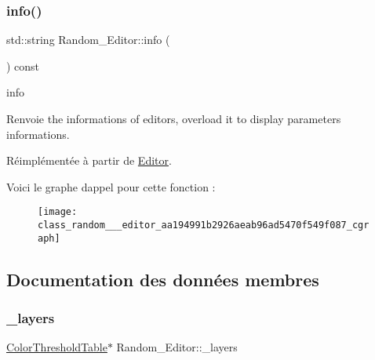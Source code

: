 \subsubsection{\texorpdfstring{info()}{info()}}
{\footnotesize\ttfamily std\+::string Random\+\_\+\+Editor\+::info (\begin{DoxyParamCaption}{ }\end{DoxyParamCaption}) const\hspace{0.3cm}{\ttfamily [virtual]}}



info 

\begin{DoxyReturn}{Renvoie}
the informations of editors, overload it to display parameters informations. 
\end{DoxyReturn}


Réimplémentée à partir de \hyperlink{class_editor_a5747cd74b71d67f6d39b094071058382}{Editor}.

Voici le graphe d\textquotesingle{}appel pour cette fonction \+:
\nopagebreak
\begin{figure}[H]
\begin{center}
\leavevmode
\texttt{[image: class\_random\_\_\_editor\_aa194991b2926aeab96ad5470f549f087\_cgraph]}
\end{center}
\end{figure}


\subsection{Documentation des données membres}
\mbox{\label{class_random___editor_af2105a201bbe9cf3ad46137037a6b69d}} 
\subsubsection{\texorpdfstring{\+\_\+layers}{\_layers}}
{\footnotesize\ttfamily \hyperlink{thresholdtable_8h_ab0deb49d07758f9814993774cb9935cc}{Color\+Threshold\+Table}$\ast$ Random\+\_\+\+Editor\+::\+\_\+layers\hspace{0.3cm}{\ttfamily [private]}}

\mbox{\label{class_random___editor_a3f94d9732552caff8f645cd077f4743b}} 
